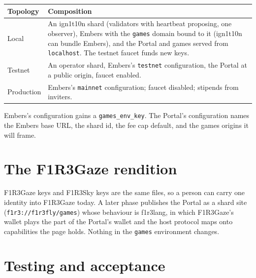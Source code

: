 \documentclass[11pt]{article}
\theoremstyle{definition}
\theoremstyle{remark}
\newcommand{\code}[1]{\texttt{#1}}
\newcommand{\Em}{Embers}
\newcommand{\Sky}{F1R3Sky}
\newcommand{\Gz}{F1R3Gaze}
\begin{document}
\begin{longtable}{@{}>{\raggedright\arraybackslash}p{}>{\raggedright\arraybackslash}p{}@{}}
\toprule
Topology & Composition\\
\midrule
\endhead
Local & An ign1t10n shard (validators with heartbeat proposing, one observer),
  \Em{} with the \code{games} domain bound to it (ign1t10n can bundle \Em{}), and the
  Portal and games served from \code{localhost}. The testnet faucet funds new keys.\\
Testnet & An operator shard, \Em{}'s \code{testnet} configuration, the Portal at a
  public origin, faucet enabled.\\
Production & \Em{}'s \code{mainnet} configuration; faucet disabled; stipends from
  inviters.\\
\bottomrule
\end{longtable}

\Em{}'s configuration gains a \code{games\_env\_key}. The Portal's configuration names
the \Em{} base URL, the shard id, the fee cap default, and the games origins it will
frame.

\section{The \Gz{} rendition}\label{sec:gaze}

\Gz{} keys and \Sky{} keys are the same files, so a person can carry one identity
into \Gz{} today. A later phase publishes the Portal as a shard site
(\code{f1r3://f1r3fly/games}) whose behaviour is f1r3lang, in which \Gz{}'s wallet
plays the part of the Portal's wallet and the host protocol maps onto capabilities
the page holds. Nothing in the \code{games} environment changes.

\section{Testing and acceptance}\label{sec:accept}
\end{document}
